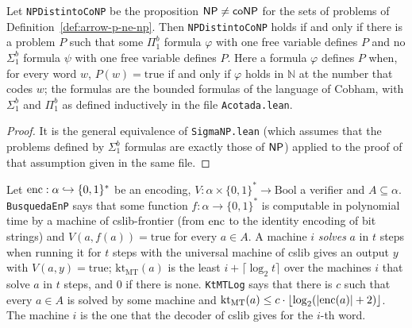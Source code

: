 \begin{theorem}
  \label{thm:arrow-np-conp-formulas}
  \leanok
  Let \texttt{NPDistintoCoNP} be the proposition $\mathsf{NP} \neq \mathsf{co}\mathsf{NP}$ for the sets of problems
  of Definition~\ref{def:arrow-p-ne-np}. Then \texttt{NPDistintoCoNP} holds if and only if there is a
  problem $P$ such that some $\Pi^b_1$ formula $\varphi$ with one free variable defines $P$ and no
  $\Sigma^b_1$ formula $\psi$ with one free variable defines $P$. Here a formula $\varphi$ defines $P$
  when, for every word $w$, $P(w) = \mathrm{true}$ if and only if $\varphi$ holds in $\mathbb{N}$ at the
  number that codes $w$; the formulas are the bounded formulas of the language of Cobham, with
  $\Sigma^b_1$ and $\Pi^b_1$ as defined inductively in the file \texttt{Acotada.lean}.
  \own{}
\end{theorem}

\begin{proof}
  \leanok
  It is the general equivalence of \texttt{SigmaNP.lean} (which assumes that the problems defined by
  $\Sigma^b_1$ formulas are exactly those of $\mathsf{NP}$) applied to the proof of that assumption given in
  the same file.
\end{proof}

\begin{definition}
  \label{def:arrow-kt}
  \leanok
  Let $\mathrm{enc} : \alpha \hookrightarrow \{0,1\}^*$ be an encoding, $V : \alpha \times \{0,1\}^* \to
  \mathrm{Bool}$ a verifier and $A \subseteq \alpha$. \texttt{BusquedaEnP} says that some function
  $f : \alpha \to \{0,1\}^*$ is computable in polynomial time by a machine of cslib-frontier (from
  $\mathrm{enc}$ to the identity encoding of bit strings) and $V(a, f(a)) = \mathrm{true}$ for every $a \in A$.
  A machine $i$ \emph{solves} $a$ in $t$ steps when running it for $t$ steps with the universal
  machine of cslib gives an output $y$ with $V(a, y) = \mathrm{true}$; $\mathrm{kt}_{\mathrm{MT}}(a)$
  is the least $i + \lceil \log_2 t \rceil$ over the machines $i$ that solve $a$ in $t$ steps, and $0$ if
  there is none. \texttt{KtMTLog} says that there is $c$ such that every $a \in A$ is solved by some
  machine and $\mathrm{kt}_{\mathrm{MT}}(a) \le c \cdot \lfloor \log_2 (|\mathrm{enc}(a)| + 2) \rfloor$. The
  machine $i$ is the one that the decoder of cslib gives for the $i$-th word.
  \own{}
\end{definition}

